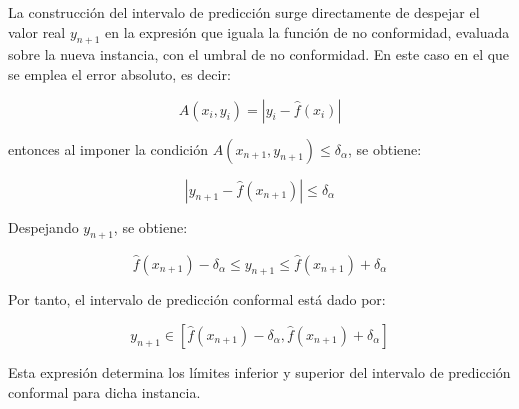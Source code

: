 La construcción del intervalo de predicción surge directamente de despejar el valor real $y_{n+1}$ en la expresión que iguala la función de no conformidad, evaluada sobre la nueva instancia, con el umbral de no conformidad. En este caso en el que se emplea el error absoluto, es decir:

$$
A(x_i, y_i) = | y_i - \hat{f}(x_i) |
$$

entonces al imponer la condición $A(x_{n+1}, y_{n+1}) \le \delta_\alpha$, se obtiene: 

$$
|y_{n+1}-\hat{f}(x_{n+1})| \le \delta_\alpha
$$

Despejando $y_{n+1}$, se obtiene:

$$
\hat{f}(x_{n+1}) - \delta_\alpha \le y_{n+1} \le \hat{f}(x_{n+1}) + \delta_\alpha 
$$

Por tanto, el intervalo de predicción conformal está dado por:

$$
y_{n+1} \in \left[ \hat{f}(x_{n+1})-\delta_\alpha , \hat{f}(x_{n+1})+\delta_\alpha  \right] 
$$

Esta expresión determina los límites inferior y superior del intervalo de predicción conformal para dicha
instancia.

